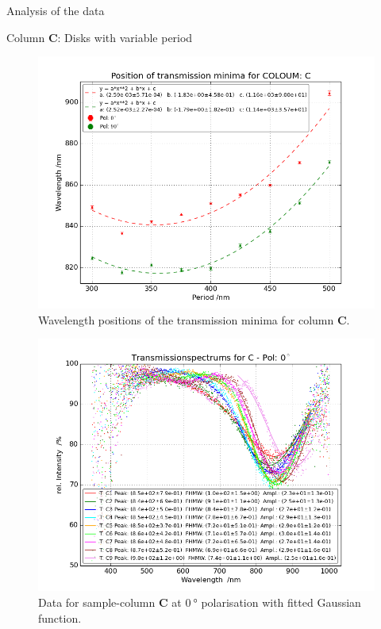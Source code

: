 \documentclass[pdftex, a4paper,11pt, twoside, UKenglish]{report}
\begin{document}
\begin{chapter}{Analysis of the data}
\begin{section}{Column \textbf{C}: Disks with variable period}
      \begin{figure}[b!]
        \centering
        \includegraphics[width=\textwidth]{Figures/MinimaPosC.png}
        \caption{Wavelength positions of the transmission minima for column
            \textbf{C}.}
        \label{fig:MinimaPosC}
      \end{figure}
      \newpage
      \begin{figure}[ht!]
        \centering
        \begin{minipage}{.95\textwidth}
          \centering
          \includegraphics[width=\textwidth]
              {Figures/TransspecFIT_CPol0.png}
          \caption{Data for sample-column \textbf{C} at $\SI{0}{\degree}$
              polarisation with fitted Gaussian function.}

\end{minipage}
\end{figure}
\end{section}
\end{chapter}
\end{document}

